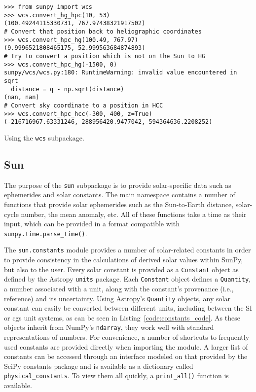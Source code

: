 \begin{listing}[H]
\begin{verbatim}
>>> from sunpy import wcs
>>> wcs.convert_hg_hpc(10, 53)
(100.49244115330731, 767.97438321917502)
# Convert that position back to heliographic coordinates
>>> wcs.convert_hpc_hg(100.49, 767.97)
(9.9996521808465175, 52.999563684874893)
# Try to convert a position which is not on the Sun to HG
>>> wcs.convert_hpc_hg(-1500, 0)
sunpy/wcs/wcs.py:180: RuntimeWarning: invalid value encountered in sqrt
  distance = q - np.sqrt(distance)
(nan, nan)
# Convert sky coordinate to a position in HCC
>>> wcs.convert_hpc_hcc(-300, 400, z=True)
(-216716967.63331246, 288956420.9477042, 594364636.2208252)
\end{verbatim}
\caption{Using the \texttt{wcs} subpackage.}
\label{code:wcs_code}
\end{listing}

\subsection{Sun}\label{ssec:util:sun}
The purpose of the \texttt{sun} subpackage is to provide solar-specific data such as ephemerides and
solar constants. The main namespace contains a number of functions that provide solar
ephemerides such as the Sun-to-Earth distance, solar-cycle number, the mean 
anomaly, etc.
All of these functions take a time as their input, which can be provided in a format
compatible with \texttt{sunpy.time.parse\_time()}. 

The \texttt{sun.constants} module provides a number of solar-related 
constants in order to provide consistency in the calculations of derived solar 
values within SunPy, but also to the user. Every solar 
constant is provided as a \texttt{Constant} object as defined by the Astropy \texttt{units} package. Each 
\texttt{Constant} object defines a \texttt{Quantity}, a number associated with a unit, along with 
the constant's provenance (i.e., reference) and its uncertainty. Using 
Astropy's \texttt{Quantity} objects, any solar constant can easily be converted between 
different units, including between the SI or cgs unit systems, as can be seen in Listing~\ref{code:constants_code}.
As these objects inherit from 
NumPy's \texttt{ndarray}, they work well with standard representations of numbers.
For convenience, a number of shortcuts to frequently used constants are provided 
directly when importing the module. A larger list of constants can be 
accessed through an interface modeled on that provided by the SciPy constants 
package and is available as a dictionary called \texttt{physical\_constants}. 
To view them all quickly, a \texttt{print\_all()} function is available.

